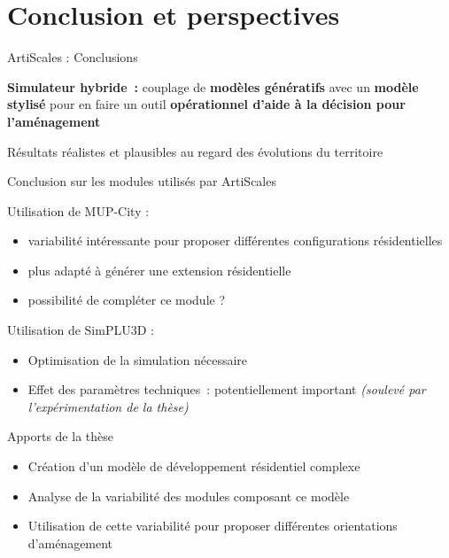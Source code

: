 \documentclass[xcolor=table]{beamer}
\begin{document}
\section{Conclusion et perspectives}



\begin{frame}{ArtiScales : Conclusions}
	\begin{block}{}
		\textbf{Simulateur hybride~:} couplage de \textbf{modèles génératifs} avec un \textbf{modèle stylisé} pour en faire un outil \textbf{opérationnel d'aide à la décision pour l'aménagement}
	\end{block}
	\begin{block}{}
		Résultats réalistes et plausibles au regard des évolutions du territoire
	\end{block}
\end{frame}

\begin{frame}{Conclusion sur les modules utilisés par ArtiScales}
	\begin{block}{Utilisation de MUP-City :}
		\begin{itemize}
			\item variabilité intéressante pour proposer différentes configurations résidentielles
			\item plus adapté à générer une extension résidentielle
			\item possibilité de compléter ce module ? 			
		\end{itemize}
	\end{block}
	\begin{block}{Utilisation de SimPLU3D :}
		\begin{itemize}
			\item Optimisation de la simulation nécessaire
			\item Effet des paramètres techniques~: potentiellement important \textit{(soulevé par l'expérimentation de la thèse)}	\end{itemize}	
		\end{block}
\end{frame}
\begin{frame}{Apports de la thèse}
	\begin{itemize}
		\item Création d'un modèle de développement résidentiel complexe
		\item Analyse de la variabilité des modules composant ce modèle
		\item Utilisation de cette variabilité pour proposer différentes orientations d'aménagement
	\end{itemize}
\end{frame}
\end{document}
